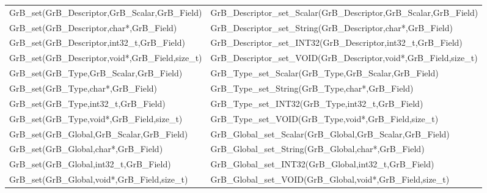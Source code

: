 \begin{table}[htb]
{\begin{tabular}{l|l}
{\sf GrB\_set(GrB\_Descriptor,GrB\_Scalar,GrB\_Field)}  & {\sf GrB\_Descriptor\_set\_Scalar(GrB\_Descriptor,GrB\_Scalar,GrB\_Field)} \\
{\sf GrB\_set(GrB\_Descriptor,char*,GrB\_Field)}        & {\sf GrB\_Descriptor\_set\_String(GrB\_Descriptor,char*,GrB\_Field)}       \\
{\sf GrB\_set(GrB\_Descriptor,int32\_t,GrB\_Field)}       & {\sf GrB\_Descriptor\_set\_INT32(GrB\_Descriptor,int32\_t,GrB\_Field)}    \\
{\sf GrB\_set(GrB\_Descriptor,void*,GrB\_Field,size\_t)}      & {\sf GrB\_Descriptor\_set\_VOID(GrB\_Descriptor,void*,GrB\_Field,size\_t)}   \\
\hline

{\sf GrB\_set(GrB\_Type,GrB\_Scalar,GrB\_Field)}  & {\sf GrB\_Type\_set\_Scalar(GrB\_Type,GrB\_Scalar,GrB\_Field)} \\
{\sf GrB\_set(GrB\_Type,char*,GrB\_Field)}        & {\sf GrB\_Type\_set\_String(GrB\_Type,char*,GrB\_Field)}       \\
{\sf GrB\_set(GrB\_Type,int32\_t,GrB\_Field)}       & {\sf GrB\_Type\_set\_INT32(GrB\_Type,int32\_t,GrB\_Field)}    \\
{\sf GrB\_set(GrB\_Type,void*,GrB\_Field,size\_t)}      & {\sf GrB\_Type\_set\_VOID(GrB\_Type,void*,GrB\_Field,size\_t)}   \\
\hline

{\sf GrB\_set(GrB\_Global,GrB\_Scalar,GrB\_Field)}  & {\sf GrB\_Global\_set\_Scalar(GrB\_Global,GrB\_Scalar,GrB\_Field)} \\
{\sf GrB\_set(GrB\_Global,char*,GrB\_Field)}        & {\sf GrB\_Global\_set\_String(GrB\_Global,char*,GrB\_Field)}       \\
{\sf GrB\_set(GrB\_Global,int32\_t,GrB\_Field)}       & {\sf GrB\_Global\_set\_INT32(GrB\_Global,int32\_t,GrB\_Field)}    \\
{\sf GrB\_set(GrB\_Global,void*,GrB\_Field,size\_t)}      & {\sf GrB\_Global\_set\_VOID(GrB\_Global,void*,GrB\_Field,size\_t)}   \\
\hline
\end{tabular}
}
\label{Tab:NonPolymorphic7b}
\end{table}